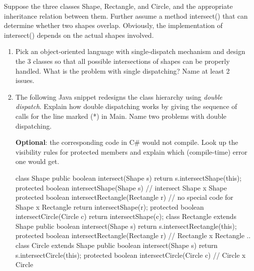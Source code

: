 \documentclass{article}
\begin{document}
Suppose the three classes \textsf{Shape}, \textsf{Rectangle}, and 
\textsf{Circle}, and the appropriate inheritance relation between them.
Further assume a method \textsf{intersect()} that can determine whether two
shapes overlap. Obviously, the implementation of \textsf{intersect()} 
depends on the actual shapes involved. 

\begin{enumerate}
\item Pick an object-oriented language with single-dispatch mechanism 
and design  the 3 classes so that all possible intersections
of shapes can be properly handled. 
What is the problem with single dispatching? Name at least 2 issues.
\item The following Java snippet redesigns the
class hierarchy using \textit{double dispatch}. 
Explain how double dispatching works by
giving the sequence of calls for the line marked (*) in \textsf{Main}.
Name two problems
with double dispatching.

\textbf{Optional}: the corresponding code in C\# would not 
compile. Look up the visibility rules for \textsf{protected} members
and explain which (compile-time) error one would get. 
\begin{java}
class Shape {
    public  boolean intersect(Shape s) {
         return s.intersectShape(this);
    }
    protected  boolean intersectShape(Shape s) {
        // intersect Shape x Shape
    }
    protected  boolean intersectRectangle(Rectangle r) {
        // no special code for Shape x Rectangle
        return intersectShape(r);
    }
    protected  boolean intersectCircle(Circle c) {
        return intersectShape(c);
   }
}
class Rectangle extends Shape {
    public  boolean intersect(Shape s) {
        return s.intersectRectangle(this);  
    }
    protected  boolean intersectRectangle(Rectangle r) {
        // Rectangle x Rectangle
        ..
    }
}
class Circle extends Shape {
    public  boolean intersect(Shape s) {
        return s.intersectCircle(this);  
    }
    protected  boolean intersectCircle(Circle c) {
        // Circle x Circle 
   }   
}


\end{java}
\end{enumerate}
\end{document}
